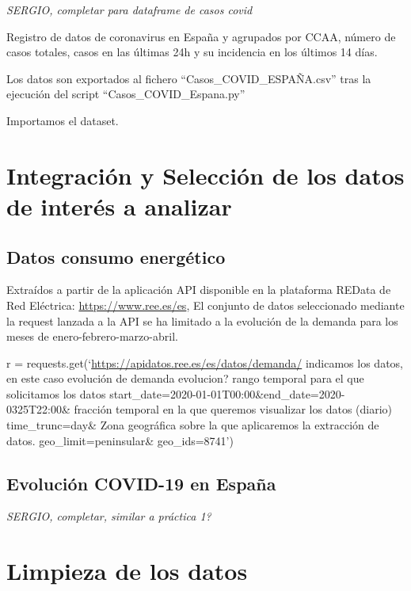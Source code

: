 \documentclass[
]{article}
\begin{document}
{ \emph{SERGIO, completar para dataframe de casos covid}}

Registro de datos de coronavirus en España y agrupados por CCAA, número
de casos totales, casos en las últimas 24h y su incidencia en los
últimos 14 días.

Los datos son exportados al fichero ``Casos\_COVID\_ESPAÑA.csv'' tras la
ejecución del script ``Casos\_COVID\_Espana.py''

Importamos el dataset.

\hypertarget{integraciuxf3n-y-selecciuxf3n-de-los-datos-de-interuxe9s-a-analizar}{%
\section{Integración y Selección de los datos de interés a
analizar}\label{integraciuxf3n-y-selecciuxf3n-de-los-datos-de-interuxe9s-a-analizar}}

\hypertarget{datos-consumo-energuxe9tico}{%
\subsection{Datos consumo
energético}\label{datos-consumo-energuxe9tico}}

Extraídos a partir de la aplicación API disponible en la plataforma
REData de Red Eléctrica: \url{https://www.ree.es/es}, El conjunto de
datos seleccionado mediante la request lanzada a la API se ha limitado a
la evolución de la demanda para los meses de enero-febrero-marzo-abril.

r = requests.get(`\url{https://apidatos.ree.es/es/datos/demanda/}
indicamos los datos, en este caso evolución de demanda evolucion? rango
temporal para el que solicitamos los datos
start\_date=2020-01-01T00:00\&end\_date=2020-0325T22:00\& fracción
temporal en la que queremos visualizar los datos (diario)
time\_trunc=day\& Zona geográfica sobre la que aplicaremos la extracción
de datos. geo\_limit=peninsular\& geo\_ids=8741')

\hypertarget{evoluciuxf3n-covid-19-en-espauxf1a}{%
\subsection{Evolución COVID-19 en
España}\label{evoluciuxf3n-covid-19-en-espauxf1a}}

{ \emph{SERGIO, completar, similar a práctica 1?}}

\hypertarget{limpieza-de-los-datos}{%
\section{Limpieza de los datos}\label{limpieza-de-los-datos}}
\end{document}
